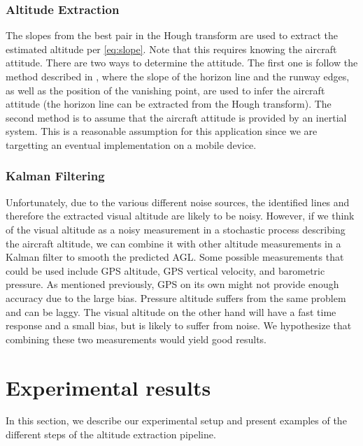 \documentclass[letterpaper, conference]{IEEEtran}  %
\begin{document}
\subsubsection*{\textbf{Altitude Extraction}}
The slopes from the best pair in the Hough transform are used to extract the estimated altitude per \cref{eq:slope}. Note that this requires knowing the aircraft attitude. There are two ways to determine the attitude. The first one is follow the method described in \cite{Sasa2000}, where the slope of the horizon line and the runway edges, as well as the position of the vanishing point, are used to infer the aircraft attitude (the horizon line can be extracted from the Hough transform). The second method is to assume that the aircraft attitude is provided by an inertial system. This is a reasonable assumption for this application since we are targetting an eventual implementation on a mobile device. 

\subsubsection*{\textbf{Kalman Filtering}}
\label{sec:pipeline:kalman}
Unfortunately, due to the various different noise sources, the identified lines and therefore the extracted visual altitude are likely to be noisy. However, if we think of the visual altitude as a noisy measurement in a stochastic process describing the aircraft altitude, we can combine it with other altitude measurements in a Kalman filter to smooth the predicted AGL. Some possible measurements that could be used include GPS altitude, GPS vertical velocity, and barometric pressure.
As mentioned previously, GPS on its own might not provide enough accuracy due to the large bias. Pressure altitude suffers from the same problem and can be laggy. The visual altitude on the other hand will have a fast time response and a small bias, but is likely to suffer from noise. We hypothesize that combining these two measurements would yield good results.


\section{Experimental results}
In this section, we describe our experimental setup and present examples of the different steps of the altitude extraction pipeline.
\end{document}
